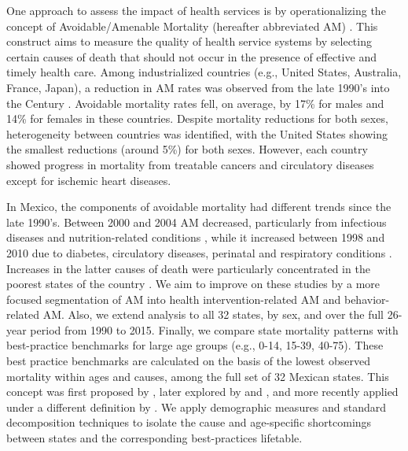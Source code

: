 \documentclass{article}
\begin{document}
 One approach to assess the impact of health services is by operationalizing the
 concept of Avoidable/Amenable Mortality (hereafter abbreviated AM)
 \citep{nolte&mckee2004, nolte&mckee2008}. This construct aims to measure the quality of health service systems by selecting certain
 causes of death that should not occur in the presence of effective and
 timely health care. Among industrialized countries (e.g., United States,
 Australia, France, Japan), a reduction in AM rates was
 observed from the late 1990's into the  Century
 \citep{nolte&mckee2008}. Avoidable mortality rates fell, on average, by 17\%
 for males and 14\% for females in these countries. Despite mortality reductions for
 both sexes, heterogeneity between countries was identified, with the United
 States showing the smallest reductions (around 5\%) for both sexes. However,
 each country showed progress in mortality from treatable cancers and
 circulatory diseases except for ischemic heart diseases.

In Mexico, the components of avoidable mortality had different trends since the
late 1990's. Between 2000 and 2004 AM decreased, particularly from
infectious diseases and nutrition-related conditions \citep{francomarina2006}, while it increased between 1998 and 2010 due to diabetes, circulatory diseases, perinatal and respiratory conditions
\citep{agudelo2014efecto}. Increases in the latter causes
of death were particularly concentrated in the poorest states of the country
\citep{davila2014mortalidad}. We aim to improve on these studies
by a more focused segmentation of AM into health intervention-related AM and
behavior-related AM. Also, we extend analysis to all 32 states, by sex, and over
the full 26-year period from 1990 to 2015. Finally, we compare state mortality patterns
with best-practice benchmarks for large age groups (e.g., 0-14, 15-39, 40-75). These best practice
benchmarks are calculated on the basis of the lowest observed mortality within
ages and causes, among the full set of 32 Mexican states. This concept was first
proposed by \citet{whelpton1947}, later explored by  \citet{wunsch1975minimum} and
\citet{vallin2008minimum}, and more recently applied under a different
definition by \citet{eikemo2014}. We apply demographic measures and
standard decomposition techniques to isolate the cause and age-specific shortcomings between states and the corresponding best-practices lifetable. 
\end{document}
